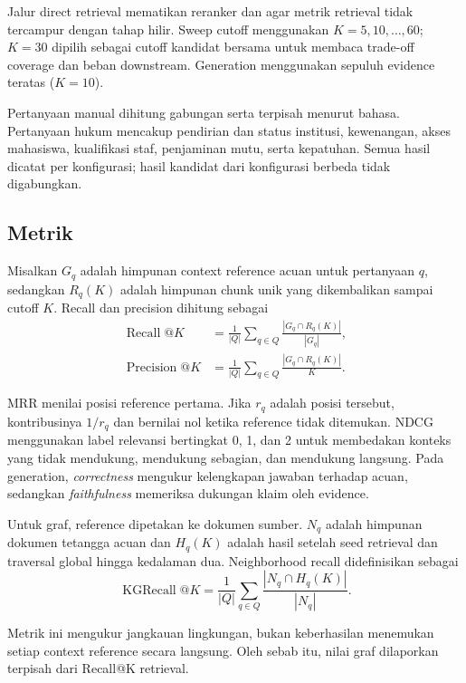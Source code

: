 Jalur direct retrieval mematikan reranker dan \kg agar metrik retrieval tidak tercampur dengan tahap hilir. Sweep cutoff menggunakan $K=5,10,\ldots,60$; $K=30$ dipilih sebagai cutoff kandidat bersama untuk membaca trade-off coverage dan beban downstream. Generation menggunakan sepuluh evidence teratas ($K=10$).

Pertanyaan manual dihitung gabungan serta terpisah menurut bahasa. Pertanyaan hukum mencakup pendirian dan status institusi, kewenangan, akses mahasiswa, kualifikasi staf, penjaminan mutu, serta kepatuhan. Semua hasil dicatat per konfigurasi; hasil kandidat dari konfigurasi berbeda tidak digabungkan.

\subsection{Metrik}

Misalkan $G_q$ adalah himpunan context reference acuan untuk pertanyaan $q$, sedangkan $R_q(K)$ adalah himpunan chunk unik yang dikembalikan sampai cutoff $K$. Recall dan precision dihitung sebagai
\begin{equation}
\begin{aligned}
\operatorname{Recall}@K&=\frac{1}{|Q|}\sum_{q\in Q}\frac{|G_q\cap R_q(K)|}{|G_q|},\\
\operatorname{Precision}@K&=\frac{1}{|Q|}\sum_{q\in Q}\frac{|G_q\cap R_q(K)|}{K}.
\end{aligned}
\label{eq:recall-precision}
\end{equation}

MRR menilai posisi reference pertama. Jika $r_q$ adalah posisi tersebut, kontribusinya $1/r_q$ dan bernilai nol ketika reference tidak ditemukan. NDCG menggunakan label relevansi bertingkat 0, 1, dan 2 untuk membedakan konteks yang tidak mendukung, mendukung sebagian, dan mendukung langsung. Pada generation, \textit{correctness} mengukur kelengkapan jawaban terhadap acuan, sedangkan \textit{faithfulness} memeriksa dukungan klaim oleh evidence.

Untuk graf, reference dipetakan ke dokumen sumber. $N_q$ adalah himpunan dokumen tetangga acuan dan $H_q(K)$ adalah hasil setelah seed retrieval dan traversal global hingga kedalaman dua. Neighborhood recall didefinisikan sebagai
\begin{equation}
\operatorname{KGRecall}@K=\frac{1}{|Q|}\sum_{q\in Q}\frac{|N_q\cap H_q(K)|}{|N_q|}.
\label{eq:kg-recall}
\end{equation}

Metrik ini mengukur jangkauan lingkungan, bukan keberhasilan menemukan setiap context reference secara langsung. Oleh sebab itu, nilai graf dilaporkan terpisah dari Recall@K retrieval.

